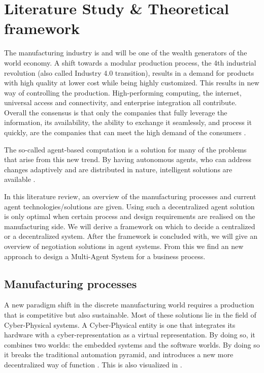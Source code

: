 \chapter{Literature Study \& Theoretical framework}
\label{ch:literature}
The manufacturing industry is and will be one of the wealth generators of the world economy. A shift towards a modular production process, the 4th industrial revolution (also called Industry 4.0 transition), results in a demand for products with high quality at lower cost while being highly customized. This results in new way of controlling the production. High-performing computing, the internet, universal access and connectivity, and enterprise integration all contribute. Overall the consensus is that only the companies that fully leverage the information, its availability, the ability to exchange it seamlessly, and process it quickly, are the companies that can meet the high demand of the consumers \citep{monostori2006agent}. 

The so-called agent-based computation is a solution for many of the problems that arise from this new trend. By having autonomous agents, who can address changes adaptively and are distributed in nature, intelligent solutions are available \citep{monostori2006agent}.

In this literature review, an overview of the manufacturing processes and current agent technologies/solutions are given. Using such a decentralized agent solution is only optimal when certain process and design requirements are realised on the manufacturing side. We will derive a framework on which to decide a centralized or a decentralized system. After the framework is concluded with, we will give an overview of negotiation solutions in agent systems. From this we find an new approach to design a Multi-Agent System for a business process.

\section{Manufacturing processes}
	
A new paradigm shift in the discrete manufacturing world requires a production that is competitive but also sustainable. Most of these solutions lie in the field of Cyber-Physical systems. A Cyber-Physical entity is one that integrates its hardware with a cyber-representation as a virtual representation. By doing so, it combines two worlds: the embedded systems and the software worlds. By doing so it breaks the traditional automation pyramid, and introduces a new more decentralized way of function \citep{leitao2016smart}. This is also visualized in . %
	
